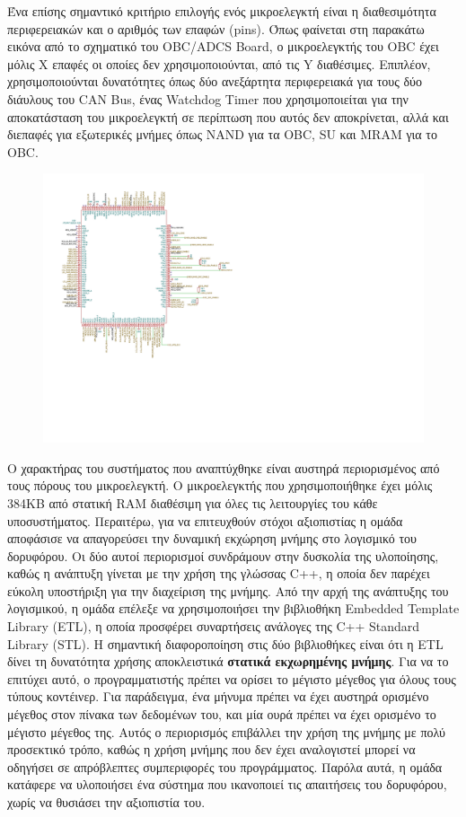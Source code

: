 \documentclass[a4paper,nobib,justified]{tufte-book}
\begin{document}
Ένα επίσης σημαντικό κριτήριο επιλογής ενός μικροελεγκτή είναι η διαθεσιμότητα περιφερειακών και ο αριθμός των επαφών (pins). Όπως φαίνεται στη παρακάτω εικόνα από το σχηματικό του OBC/ADCS Board, ο μικροελεγκτής του OBC έχει μόλις X επαφές οι οποίες δεν χρησιμοποιούνται, από τις Y διαθέσιμες. Επιπλέον, χρησιμοποιούνται δυνατότητες όπως δύο ανεξάρτητα περιφερειακά για τους δύο διάυλους του CAN Bus, ένας Watchdog Timer που χρησιμοποιείται για την αποκατάσταση του μικροελεγκτή σε περίπτωση που αυτός δεν αποκρίνεται, αλλά και διεπαφές για εξωτερικές μνήμες όπως NAND για τα OBC, SU και MRAM για το OBC.  %
\begin{figure}[ht]
	\includegraphics{media/diagrams/obc-mcu-schematic.pdf}
\end{figure}

Ο χαρακτήρας του συστήματος που αναπτύχθηκε είναι αυστηρά περιορισμένος από τους πόρους του μικροελεγκτή. Ο μικροελεγκτής που χρησιμοποιήθηκε έχει μόλις 384KB από στατική RAM διαθέσιμη για όλες τις λειτουργίες του κάθε υποσυστήματος. Περαιτέρω, για να επιτευχθούν στόχοι αξιοπιστίας η ομάδα αποφάσισε να απαγορεύσει την δυναμική εκχώρηση μνήμης στο λογισμικό του δορυφόρου. Οι δύο αυτοί περιορισμοί συνδράμουν στην δυσκολία της υλοποίησης, καθώς η ανάπτυξη γίνεται με την χρήση της γλώσσας C++, η οποία δεν παρέχει εύκολη υποστήριξη για την διαχείριση της μνήμης. Από την αρχή της ανάπτυξης του λογισμικού, η ομάδα επέλεξε να χρησιμοποιήσει την βιβλιοθήκη Embedded Template Library (ETL), η οποία προσφέρει συναρτήσεις ανάλογες της C++ Standard Library (STL). Η σημαντική διαφοροποίηση στις δύο βιβλιοθήκες είναι ότι η ETL δίνει τη δυνατότητα χρήσης αποκλειστικά \textbf{στατικά εκχωρημένης μνήμης}. Για να το επιτύχει αυτό, ο προγραμματιστής πρέπει να ορίσει το μέγιστο μέγεθος για όλους τους τύπους κοντέινερ. Για παράδειγμα, ένα μήνυμα πρέπει να έχει αυστηρά ορισμένο μέγεθος στον πίνακα των δεδομένων του, και μία ουρά πρέπει να έχει ορισμένο το μέγιστο μέγεθος της. Αυτός ο περιορισμός επιβάλλει την χρήση της μνήμης με πολύ προσεκτικό τρόπο, καθώς η χρήση μνήμης που δεν έχει αναλογιστεί μπορεί να οδηγήσει σε απρόβλεπτες συμπεριφορές του προγράμματος. Παρόλα αυτά, η ομάδα κατάφερε να υλοποιήσει ένα σύστημα που ικανοποιεί τις απαιτήσεις του δορυφόρου, χωρίς να θυσιάσει την αξιοπιστία του.
\end{document}
